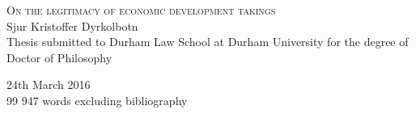 \begin{titlepage}

\begin{center}



\vspace*{\fill}
\centering

{\Huge\textsc{On the legitimacy of economic development takings}}\\[3cm]


{\huge Sjur Kristoffer Dyrkolbotn}\\

\large {Thesis submitted to Durham Law School at Durham University for the degree of Doctor of Philosophy} \\

\vspace*{\fill}

 

\vfill

{\Large 24th March 2016}\\
{99 947 words excluding bibliography}

\end{center}

\end{titlepage}
